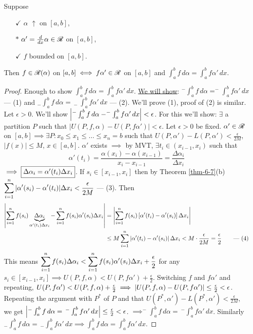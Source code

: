 \documentclass[]{article}
\begin{document}
\begin{theorem}
	\label{thm-6-17}
	Suppose
	\begin{enumerate}
		\item[$\checkmark$] $\alpha$ $\uparrow$ on $[a,b]$,
		\item[$*$] $\alpha'=\frac d{dx}\alpha\in\ms R$ on $[a,b]$,
		\item[$\checkmark$] $f$ bounded on $[a,b]$.
	\end{enumerate}
	Then $f\in\ms R(\alpha)$ on $[a,b] \iff f\alpha'\in\ms R$ on $[a,b]$ and $\int_a^b f\,d\alpha = \int_a^b f\alpha'\,dx$.
\end{theorem}
\newpage
\begin{proof}
	Enough to show $\int_a^bf\,d\alpha = \int_a^bf\alpha'\,dx$.
	\ul{We will show}: $^-\int_a^b f\,d\alpha = ^-\int_a^bf\alpha'\,dx$ --- (1) and $_-\int_a^bf\,d\alpha =\, _-~\int_a^bf\alpha'\,dx$ --- (2).
	We'll prove (1), proof of (2) is similar.
	Let $\epsilon>0$. We'll show $ \mlr{^-\int_a^bf\,d\alpha-^-\int_a^bf\alpha'\,dx} < \epsilon$.
	For this we'll show: $\exists$ a partition $P$ such that
	$ |U(P,f,\alpha)-U(P,f\alpha')|<\epsilon$.
	Let $\epsilon>0$ be fixed. $\alpha'\in\ms R$ on $[a,b] \implies \exists P: x_0\leq x_1\leq \dots \leq x_n=b$ such that $U(P,\alpha')-L(P,\alpha') < \frac\epsilon{2M}$, $|f(x)|\leq M$, $x\in[a,b]$.
	$\alpha'$ exists $\implies $ by MVT, $\exists t_i\in(x_{i-1},x_i)$ such that 
	$$\alpha'(t_i) = \frac{\alpha(x_i)-\alpha(x_{i-1})}{x_i-x_{i-1}} = \frac{\Delta\alpha_i}{\Delta x_i}$$
	$\implies \fbox{$\Delta\alpha_i=\alpha'(t_i)\Delta x_i$}$.
	If $s_i\in[x_{i-1},x_i]$ then by Theorem \ref{thm-6-7}(b)
	$\ds \sum_{i=1}^n |\alpha'(s_i)-\alpha'(t_i)|\Delta x_i<\frac\epsilon{2M}$ --- (3).
	Then
	\begin{align*}
		\mlr{\sum_{i=1}^n f(s_i)\ub{\alpha'(t_i)\Delta x_i}{\Delta\alpha_i} - \sum_{i=1}^n f(s_i) \alpha'(s_i)\Delta x_i}
		&= \mlr{\sum_{i=1}^n f(s_i)\blr{\alpha'(t_i)-\alpha'(s_i)}\Delta x_i} \\
		&\leq M\sum_{i=1}^n \mlr{\alpha'(t_i)-\alpha'(s_i)}\Delta x_i < M\cdot\frac\epsilon{2M}=\frac\epsilon2 \qquad \text{--- (4)}
	\end{align*}
	This means $\ds\sum_{i=1}^n f(s_i)\Delta\alpha_i < \sum_{i=1}^n f(s_i)\alpha'(s_i) \Delta x_i + \frac\epsilon2$ for any $s_i\in[x_{i-1},x_i] \implies U(P,f,\alpha) < U(P,f\alpha')+\frac\epsilon2$.
	Switching $f$ and $f\alpha'$ and repeating, $U(P,f\alpha') < U(P,f,\alpha)+\frac\epsilon2 \implies \mlr{ U(P,f,\alpha)-U(P,f\alpha')} \leq \frac\epsilon2 < \epsilon$.
	Repeating the argument with $P^*$ of $P$ and that $U(P^*,\alpha')-L(P^*,\alpha') < \frac\epsilon{2M}$, we get $\mlr{^-\int_a^bf\,d\alpha=\,^-\int_a^bf\alpha'\,dx} \leq \frac\epsilon2<\epsilon$.
	$\implies ^-\int_a^bf\,d\alpha =\,^-\int_a^bf\alpha'\,dx$.
	Similarly $_-\int_a^bf\,d\alpha=\,_-\int_a^bf\alpha'\,dx \implies \int_a^bf\,d\alpha = \int_a^bf\alpha'\,dx$.
\end{proof}
\end{document}
